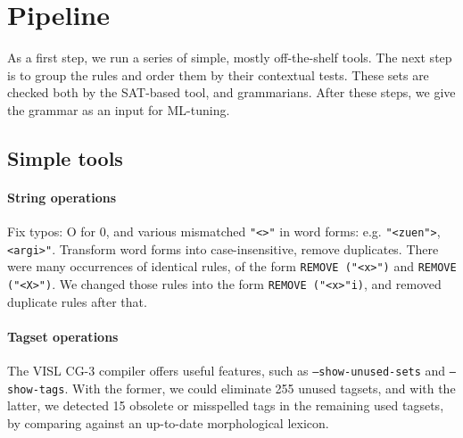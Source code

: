 \documentclass[11pt]{article}
\begin{document}
\section{Pipeline}

As a first step, we run a series of simple, mostly off-the-shelf tools. 
The next step is to group the rules and order them by their contextual tests.
These sets are checked both by the SAT-based tool, and grammarians. After these
steps, we give the grammar as an input for ML-tuning.


\subsection{Simple tools}

\paragraph{String operations}
Fix typos: O for 0, and various mismatched \texttt{"<>"} in word forms: e.g. \texttt{"<zuen">}, \texttt{<argi>"}.
Transform word forms into case-insensitive, remove duplicates. 
There were many occurrences of identical rules, of the form \texttt{REMOVE ("<x>")} and \texttt{REMOVE ("<X>")}. We changed those rules into the form \texttt{REMOVE ("<x>"i)}, and removed duplicate rules after that.

\paragraph{Tagset operations}
The VISL CG-3 compiler offers useful features, such as \texttt{--show-unused-sets} and \texttt{--show-tags}. With the former, we could eliminate 255 unused tagsets, and with the latter, we detected 15 obsolete or misspelled tags in the remaining used tagsets, by comparing against an up-to-date morphological lexicon.



\end{document}
